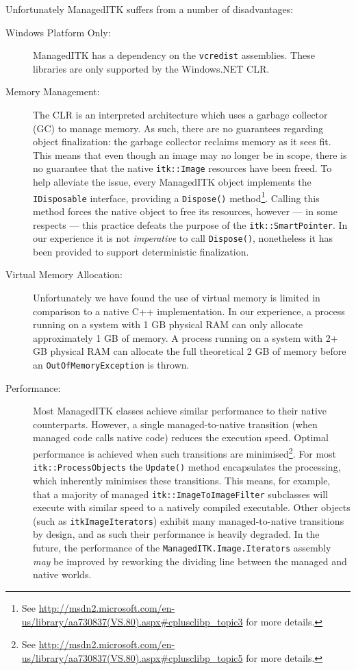 \documentclass{InsightArticle}
\def\code#1{\texttt{#1}}
\begin{document}
Unfortunately ManagedITK suffers from a number of disadvantages:
\begin{description}
	\item[Windows Platform Only:] 
	ManagedITK has a dependency on the \code{vcredist} assemblies.
	These libraries are only supported by the Windows.NET CLR.
	
	\item[Memory Management:]
	The CLR is an interpreted architecture which uses a garbage collector (GC)
	to manage memory.
	As such, there are no guarantees regarding object finalization:
	the garbage collector reclaims memory as it sees fit.
	This means that even though an image may no longer be in scope,
	there is no guarantee that the native \code{itk::Image} resources have been
	freed.
	To help alleviate the issue, every ManagedITK object implements the
	\code{IDisposable} interface, providing a \code{Dispose()} 
	method\footnote{See 
	\href{http://msdn2.microsoft.com/en-us/library/aa730837(VS.80).aspx\#cplusclibp\_topic3}
	     {http://msdn2.microsoft.com/en-us/library/aa730837(VS.80).aspx\#cplusclibp\_topic3} for
	     more details.}.
	Calling this method forces the native object to free its resources,
	however --- in some respects --- this practice defeats the purpose of
	the \code{itk::SmartPointer}.
	In our experience it is not \emph{imperative} to call \code{Dispose()},
	nonetheless it has been provided to support deterministic finalization.
	
	\item[Virtual Memory Allocation:]
	Unfortunately we have found the use of virtual memory is limited
	in comparison to a native C++ implementation.
	In our experience, a process running on a system with 1 GB physical RAM can
	only allocate approximately 1 GB of memory.
	A process running on a system with 2+ GB physical RAM can allocate the full
	theoretical 2 GB of memory before an \code{OutOfMemoryException} is thrown.
	
	\item[Performance:]
	Most ManagedITK classes achieve similar performance to their native
	counterparts.
	However, a single managed-to-native transition (when managed code calls native code)
	reduces the execution speed.
	Optimal performance is achieved when such transitions are
	minimised\footnote{See
	\href{http://msdn2.microsoft.com/en-us/library/aa730837(VS.80).aspx\#cplusclibp\_topic5}
		 {http://msdn2.microsoft.com/en-us/library/aa730837(VS.80).aspx\#cplusclibp\_topic5} for
	more details.}.
	For most \code{itk::ProcessObjects} the \code{Update()} method encapsulates the
	processing, which inherently minimises these transitions.
	This means, for example, that a majority of managed \code{itk::ImageToImageFilter}
	subclasses will execute with similar speed to a natively compiled executable.
	Other objects (such as \code{itkImageIterators})
	exhibit many managed-to-native transitions by design,
	and as such their performance is heavily degraded.
	In the future, the performance of the \code{ManagedITK.Image.Iterators} assembly
	\emph{may} be improved by reworking the dividing line between the managed and native worlds.
	

\end{description}
\end{document}
